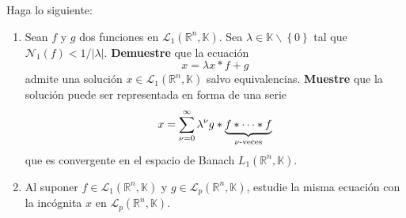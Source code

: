 \documentclass[12pt]{report}
\theoremstyle{largebreak}
\newcommand\abs[1]{\ensuremath{\big|#1\big|}}
\newcommand{\N}[2]{\ensuremath{\mathcal{N}_{#1}\left(#2\right)}}
\begin{document}
    \begin{excer}
        Haga lo siguiente:
        \begin{enumerate}
            \item Sean $f$ y $g$ dos funciones en $\mathcal{L}_1(\mathbb{R}^n,\mathbb{K})$. Sea $\lambda\in\mathbb{K}\backslash\left\{ 0\right\}$ tal que $\N{1}{f}<1/\abs{\lambda}$. \textbf{Demuestre} que la ecuación
            \begin{equation*}
                x=\lambda x*f+g
            \end{equation*}
            admite una solución $x\in\mathcal{L}_1(\mathbb{R}^n,\mathbb{K})$ salvo equivalencias. \textbf{Muestre} que la solución puede ser representada en forma de una serie
            \begin{equation*}
                x=\sum_{\nu=0}^\infty \lambda^\nu g*\underbrace{f*\cdots*f}_{\nu\textup{-veces}}
            \end{equation*}
            que es convergente en el espacio de Banach $L_1(\mathbb{R}^n,\mathbb{K})$.

            \item Al suponer $f\in\mathcal{L}_1(\mathbb{R}^n,\mathbb{K})$ y $g\in\mathcal{L}_p(\mathbb{R}^n,\mathbb{K})$, estudie la misma ecuación con la incógnita $x$ en $\mathcal{L}_p(\mathbb{R}^n,\mathbb{K})$.
        \end{enumerate}
    \end{excer}
\end{document}

